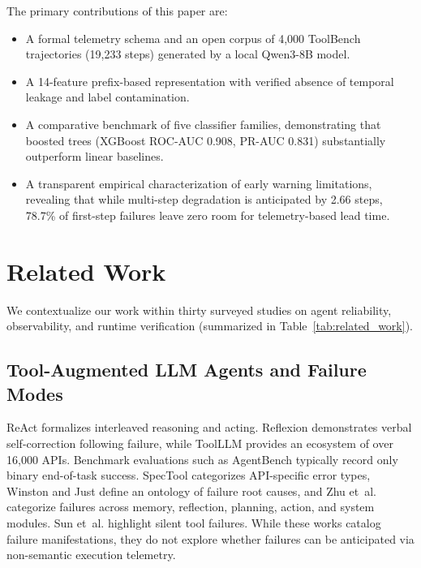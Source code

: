 \documentclass[journal,compsoc]{IEEEtran}
\begin{document}
The primary contributions of this paper are:
\begin{itemize}
    \item A formal telemetry schema and an open corpus of 4,000 ToolBench trajectories (19,233 steps) generated by a local Qwen3-8B model.
    \item A 14-feature prefix-based representation with verified absence of temporal leakage and label contamination.
    \item A comparative benchmark of five classifier families, demonstrating that boosted trees (XGBoost ROC-AUC 0.908, PR-AUC 0.831) substantially outperform linear baselines.
    \item A transparent empirical characterization of early warning limitations, revealing that while multi-step degradation is anticipated by 2.66 steps, 78.7\% of first-step failures leave zero room for telemetry-based lead time.
\end{itemize}

\section{Related Work}
We contextualize our work within thirty surveyed studies on agent reliability, observability, and runtime verification (summarized in Table~\ref{tab:related_work}).

\subsection{Tool-Augmented LLM Agents and Failure Modes}
ReAct \cite{yao2023react} formalizes interleaved reasoning and acting. Reflexion \cite{shinn2023reflexion} demonstrates verbal self-correction following failure, while ToolLLM \cite{qin2024toolllm} provides an ecosystem of over 16,000 APIs. Benchmark evaluations such as AgentBench \cite{liu2024agentbench} typically record only binary end-of-task success. SpecTool \cite{kokane2024spectool} categorizes API-specific error types, Winston and Just \cite{winston2025taxonomy} define an ontology of failure root causes, and Zhu et~al. \cite{zhu2025where} categorize failures across memory, reflection, planning, action, and system modules. Sun et~al. \cite{sun2024tools} highlight silent tool failures. While these works catalog failure manifestations, they do not explore whether failures can be anticipated via non-semantic execution telemetry.
\end{document}
